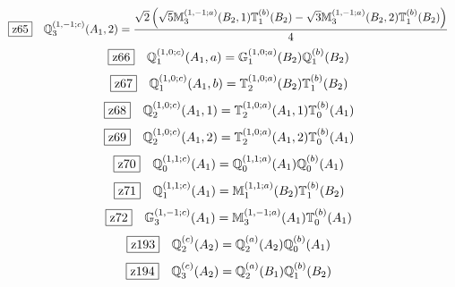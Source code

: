 \documentclass[fleqn,10pt,landscape]{jsarticle}
\begin{document}
\begin{dmath*}
\hspace*{3mm}\fbox{z65}\quad \mathbb{Q}_{3}^{(1,-1;c)}(A_{1},2)=\frac{\sqrt{2} \left(\sqrt{5} \mathbb{M}_{3}^{(1,-1;a)}(B_{2},1) \mathbb{T}_{1}^{(b)}(B_{2}) - \sqrt{3} \mathbb{M}_{3}^{(1,-1;a)}(B_{2},2) \mathbb{T}_{1}^{(b)}(B_{2})\right)}{4}
\end{dmath*}
\begin{dmath*}
\hspace*{3mm}\fbox{z66}\quad \mathbb{Q}_{1}^{(1,0;c)}(A_{1},a)=\mathbb{G}_{1}^{(1,0;a)}(B_{2}) \mathbb{Q}_{1}^{(b)}(B_{2})
\end{dmath*}
\begin{dmath*}
\hspace*{3mm}\fbox{z67}\quad \mathbb{Q}_{1}^{(1,0;c)}(A_{1},b)=\mathbb{T}_{2}^{(1,0;a)}(B_{2}) \mathbb{T}_{1}^{(b)}(B_{2})
\end{dmath*}
\begin{dmath*}
\hspace*{3mm}\fbox{z68}\quad \mathbb{Q}_{2}^{(1,0;c)}(A_{1},1)=\mathbb{T}_{2}^{(1,0;a)}(A_{1},1) \mathbb{T}_{0}^{(b)}(A_{1})
\end{dmath*}
\begin{dmath*}
\hspace*{3mm}\fbox{z69}\quad \mathbb{Q}_{2}^{(1,0;c)}(A_{1},2)=\mathbb{T}_{2}^{(1,0;a)}(A_{1},2) \mathbb{T}_{0}^{(b)}(A_{1})
\end{dmath*}
\begin{dmath*}
\hspace*{3mm}\fbox{z70}\quad \mathbb{Q}_{0}^{(1,1;c)}(A_{1})=\mathbb{Q}_{0}^{(1,1;a)}(A_{1}) \mathbb{Q}_{0}^{(b)}(A_{1})
\end{dmath*}
\begin{dmath*}
\hspace*{3mm}\fbox{z71}\quad \mathbb{Q}_{1}^{(1,1;c)}(A_{1})=\mathbb{M}_{1}^{(1,1;a)}(B_{2}) \mathbb{T}_{1}^{(b)}(B_{2})
\end{dmath*}
\begin{dmath*}
\hspace*{3mm}\fbox{z72}\quad \mathbb{G}_{3}^{(1,-1;c)}(A_{1})=\mathbb{M}_{3}^{(1,-1;a)}(A_{1}) \mathbb{T}_{0}^{(b)}(A_{1})
\end{dmath*}
\begin{dmath*}
\hspace*{3mm}\fbox{z193}\quad \mathbb{Q}_{2}^{(c)}(A_{2})=\mathbb{Q}_{2}^{(a)}(A_{2}) \mathbb{Q}_{0}^{(b)}(A_{1})
\end{dmath*}
\begin{dmath*}
\hspace*{3mm}\fbox{z194}\quad \mathbb{Q}_{3}^{(c)}(A_{2})=\mathbb{Q}_{2}^{(a)}(B_{1}) \mathbb{Q}_{1}^{(b)}(B_{2})
\end{dmath*}
\end{document}
